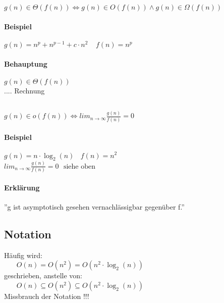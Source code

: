 \subsection{}
$g(n) \in \Theta(f(n)) \Leftrightarrow g(n) \in O(f(n)) \land g(n) \in \Omega(f(n))$
\paragraph{Beispiel} $g(n) = n^p + n^{p-1} + c \cdot n^2~~~~~f(n) = n^p$
\paragraph{Behauptung} $g(n) \in \Theta(f(n))$ \\
.... Rechnung

\subsection{}

$g(n) \in o(f(n)) \Leftrightarrow lim_{n \rightarrow \infty} \frac{g(n)}{f(n)} = 0$
\paragraph{Beispiel} $g(n) = n \cdot \log_2(n)~~~~f(n) = n^2$\\
$lim_{n \rightarrow \infty} \frac{g(n)}{f(n)} = 0~~~\text{siehe oben}$\\
\paragraph{Erklärung} ''g ist asymptotisch gesehen vernachlässigbar gegenüber f.''

\pagebreak


\begin{mdframed}
\subsection{Notation}
Häufig wird:\\
$~~~~~~~~O(n) = O(n^2) = O(n^2 \cdot \log_2(n))$ \\
geschrieben, anstelle von:\\
$~~~~~~~~O(n) \subseteq O(n^2) \subseteq O(n^2 \cdot \log_2(n))$ \\
Missbrauch der Notation !!!\\

\end{mdframed}


